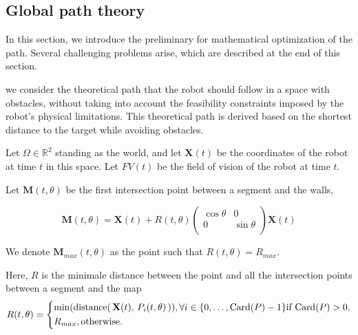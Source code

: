 \documentclass[../main.tex]{subfiles}
\begin{document}
\subsection{Global path theory}
In this section, we introduce the preliminary for mathematical optimization of the path. Several challenging problems arise, which are described at the end of this section.

we consider the theoretical path that the robot should follow in a space with obstacles, without taking into account the feasibility constraints imposed by the robot's physical limitations. This theoretical path is derived based on the shortest distance to the target while avoiding obstacles.

\vspace{1em}

Let $\Omega \in \mathbb{R}^{2}$ standing as the world, and let $\mathbf{X}(t)$ be the coordinates of the robot at time $t$ in this space.
\vspace{0.5em}
Let $FV(t)$ be the field of vision of the robot at time $t$.
\vspace{0.5em}

Let $\mathbf{M}(t, \theta)$ be the first intersection point between a segment and the walls,
\vspace{0.5em}

\begin{equation*}
	\displaystyle
	\mathbf{M}(t, \theta) = \mathbf{X}(t) + R(t, \theta) 
	\begin{pmatrix}
		\cos \theta & 0\\
		0 & \sin \theta\\
	\end{pmatrix} 
	\mathbf{X}(t)
\end{equation*}

We denote $\mathbf{M}_{max} (t, \theta)$ as the point such that $R(t, \theta) = R_{max}$.
\vspace{0.5em}

Here, $R$ is the minimale distance between the point and all the intersection points between a segment and the map
\begin{equation*}
	\displaystyle
	R(t, \theta) = 
	\begin{cases*}
		\min(\text{\rmfamily distance}( \, \mathbf{X}(t), \, P_i(t, \theta) \,)), \forall i \in \{0, \ldots, \text{\rmfamily Card}(P) - 1\} \text{\rmfamily if Card}(P) > 0,\\
		R_{max}, \text{\rmfamily otherwise}.
	\end{cases*}
\end{equation*}
\end{document}
